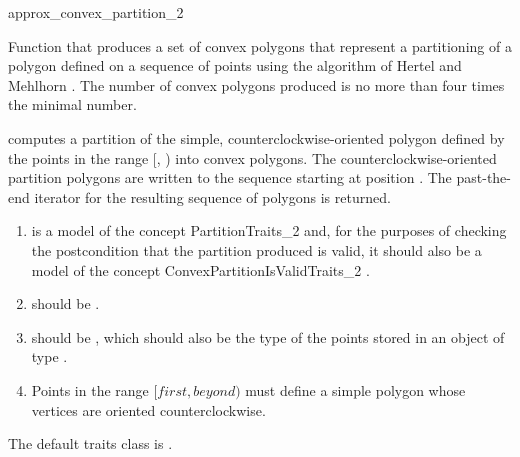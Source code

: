 \begin{ccRefFunction}{approx_convex_partition_2}

\ccDefinition
Function that produces a set of 
convex polygons that represent a partitioning of a polygon defined
on a sequence of points using the algorithm of Hertel and Mehlhorn
\cite{hm-ftsp-83}.  The number of convex polygons produced is 
no more than four times the minimal number.%


{
computes a partition of the simple, counterclockwise-oriented polygon defined 
by the points in the range [, ) into convex 
polygons. The counterclockwise-oriented partition polygons are written to
the sequence starting at position .  The past-the-end iterator for 
the resulting sequence of polygons is returned.
}

\begin{enumerate}
    \item {} is a model of the concept 
          PartitionTraits\_2
          and, for the purposes of checking the postcondition that the partition
          produced is valid, it should also be a model of
          the concept ConvexPartitionIsValidTraits\_2%
          .
    \item {} should be .
    \item {} should be ,
          which should also be the type of the points stored in an object
          of type .
    \item Points in the range $[first, beyond)$ must define a simple polygon
          whose vertices are oriented counterclockwise.
\end{enumerate}

The default traits class  is .%


\end{ccRefFunction}
